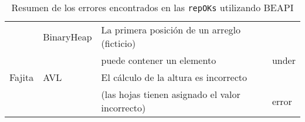 \begin{table}[!thb]
\begin{tabular}{ll|ll}
\cline{3-4} 
                        & BinaryHeap   & La primera posición de un arreglo (ficticio)\\&& puede contener un elemento &   under \\ 
\midrule
Fajita                  & AVL          & El cálculo de la altura es incorrecto \\&&(las hojas tienen asignado el valor incorrecto)  & error \\ 
\bottomrule
\end{tabular}
\caption{Resumen de los errores encontrados en las \texttt{repOKs} utilizando \textsf{BEAPI}}
\label{table:bugs}
\end{table}

